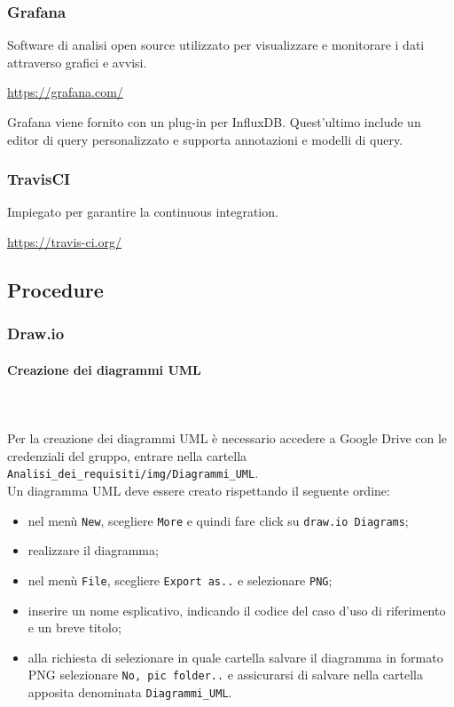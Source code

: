 	\subsubsection{Grafana}	
	Software di analisi open source utilizzato per visualizzare e monitorare i dati attraverso grafici e avvisi.\\
	\centerline{\url{https://grafana.com/}}
	Grafana viene fornito con un plug-in per InfluxDB. Quest'ultimo include un editor di query personalizzato e supporta annotazioni e modelli di query.
	\subsubsection{TravisCI}
	Impiegato per garantire la continuous integration.
	\\
	\centerline{\url{https://travis-ci.org/}}
	\subsection{Procedure}
	\subsubsection{Draw.io}
	\paragraph*{Creazione dei diagrammi UML} \mbox{} \\ \mbox{} \\
	Per la creazione dei diagrammi UML è necessario accedere a Google Drive con le credenziali del gruppo, entrare nella cartella \texttt{Analisi\_dei\_requisiti/img/Diagrammi\_UML}. \\ Un diagramma UML deve essere creato rispettando il seguente ordine: \begin{itemize}
\item nel menù \texttt{New}, scegliere \texttt{More} e quindi fare click su \texttt{draw.io Diagrams};
\item realizzare il diagramma;
\item nel menù \texttt{File}, scegliere \texttt{Export as..} e selezionare \texttt{PNG};
\item inserire un nome esplicativo, indicando il codice del caso d'uso di riferimento e un breve titolo;
\item alla richiesta di selezionare in quale cartella salvare il diagramma in formato PNG selezionare \texttt{No, pic folder..} e assicurarsi di salvare nella cartella apposita denominata \texttt{Diagrammi\_UML}.
\end{itemize}

